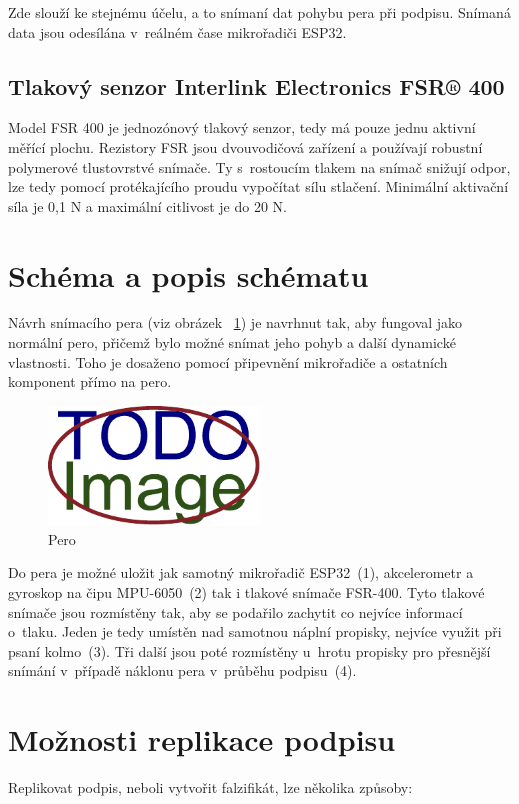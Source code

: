 Zde slouží ke stejnému účelu, a to snímaní dat pohybu pera při podpisu. %
Snímaná data jsou odesílána v~reálném čase mikrořadiči ESP32.           %

\subsection*{Tlakový senzor Interlink Electronics FSR® 400}
Model FSR 400 je jednozónový tlakový senzor, tedy má pouze jednu aktivní měřící plochu.                      %
Rezistory FSR jsou dvouvodičová zařízení a používají robustní polymerové tlustovrstvé snímače.               %
Ty s~rostoucím tlakem na snímač snižují odpor, lze tedy pomocí protékajícího proudu vypočítat sílu stlačení. %
Minimální aktivační síla je 0,1 N a maximální citlivost je do 20 N.~\cite{InterlinkElectronicsFSR400}        %

\section{Schéma a popis schématu}
Návrh snímacího pera (viz obrázek ~\ref{fig:pero}) je navrhnut tak, aby fungoval jako normální pero, 
přičemž bylo možné snímat jeho pohyb a další dynamické vlastnosti.
Toho je dosaženo pomocí připevnění mikrořadiče a ostatních komponent přímo na pero.

\begin{figure}[H]
  \centering
  \includegraphics[width=0.5\textwidth]{obrazky-figures/placeholder.pdf}
  \caption{Pero} 
  \label{fig:pero}
\end{figure}

Do pera je možné uložit jak samotný mikrořadič ESP32~(1), akcelerometr a gyroskop na čipu MPU-6050~(2) tak i tlakové snímače FSR-400.
Tyto tlakové snímače jsou rozmístěny tak, aby se podařilo zachytit co nejvíce informací o~tlaku.
Jeden je tedy umístěn nad samotnou náplní propisky, nejvíce využit při psaní kolmo~(3).
Tři další jsou poté rozmístěny u~hrotu propisky pro přesnější snímání v~případě náklonu pera v~průběhu podpisu~(4). 


\section{Možnosti replikace podpisu}
Replikovat podpis, neboli vytvořit falzifikát, lze několika způsoby:

